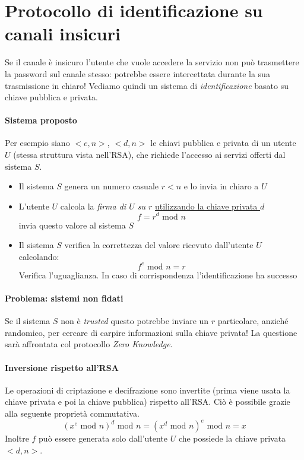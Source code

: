 \section{Protocollo di identificazione su canali insicuri}
Se il canale è insicuro l'utente che vuole accedere la servizio non può trasmettere la password sul canale stesso: potrebbe essere intercettata durante la sua trasmissione in chiaro! Vediamo quindi un sistema di \emph{identificazione} basato su chiave pubblica e privata.

\paragraph{Sistema proposto} Per esempio siano $<e,n>$, $<d,n>$ le chiavi pubblica e privata di un utente $U$ (stessa struttura vista nell'RSA), che richiede l'accesso ai servizi offerti dal sistema $S$.
\begin{itemize}
    \item Il sistema $S$ genera un numero casuale $r < n$ e lo invia in chiaro a $U$
    \item L'utente $U$ calcola la \emph{firma di $U$ su $r$} \underline{utilizzando la chiave privata $d$}
    $$ f = r^d \text{ mod } n $$
    invia questo valore al sistema $S$
    \item Il sistema $S$ verifica la correttezza del valore ricevuto dall'utente $U$ calcolando:
    $$ f^e \text{ mod }  n =r$$
    Verifica l'uguaglianza. In caso di corrispondenza l'identificazione ha successo
\end{itemize}
\paragraph{Problema: sistemi non fidati} Se il sistema $S$ non è \emph{trusted} questo potrebbe inviare un $r$ particolare, anziché randomico, per cercare di carpire informazioni sulla chiave privata! La questione sarà affrontata col protocollo \emph{Zero Knowledge}.

\paragraph{Inversione rispetto all'RSA} Le operazioni di criptazione e decifrazione sono invertite (prima viene usata la chiave privata e poi la chiave pubblica) rispetto all'RSA. Ciò è possibile grazie alla seguente proprietà commutativa.
$$ (x^e \text{ mod } n)^d \text{ mod } n = (x^d \text{ mod } n)^e \text{ mod } n = x $$
Inoltre $f$ può essere generata solo dall'utente $U$ che possiede la chiave privata $<d,n>$. 

